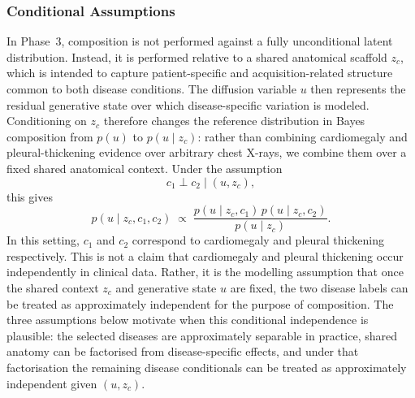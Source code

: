 \subsubsection{Conditional Assumptions}
\label{subsec:p3_assumptions}
In Phase~3, composition is not performed against a fully unconditional latent distribution. 
Instead, it is performed relative to a shared anatomical scaffold \(z_c\), which is intended to capture patient-specific and acquisition-related structure common to both disease conditions. 
The diffusion variable \(u\) then represents the residual generative state over which disease-specific variation is modeled. 
Conditioning on \(z_c\) therefore changes the reference distribution in Bayes composition from \(p(u)\) to \(p(u \mid z_c)\): rather than combining cardiomegaly and pleural-thickening evidence over arbitrary chest X-rays, we combine them over a fixed shared anatomical context. 
Under the assumption
\[
    c_1 \perp c_2 \mid (u, z_c),
\]
this gives
\begin{equation}
    p(u \mid z_c, c_1, c_2)
    \;\propto\;
    \frac{p(u \mid z_c, c_1)\,p(u \mid z_c, c_2)}{p(u \mid z_c)}.
\end{equation}
In this setting, \(c_1\) and \(c_2\) correspond to cardiomegaly and pleural thickening respectively. 
This is not a claim that cardiomegaly and pleural thickening occur independently in clinical data. 
Rather, it is the modelling assumption that once the shared context \(z_c\) and generative state \(u\) are fixed, the two disease labels can be treated as approximately independent for the purpose of composition.
The three assumptions below motivate when this conditional independence is plausible: 
the selected diseases are approximately separable in practice, shared anatomy can be factorised from disease-specific effects, and under that factorisation the remaining disease conditionals can be treated as approximately independent given \((u,z_c)\).

